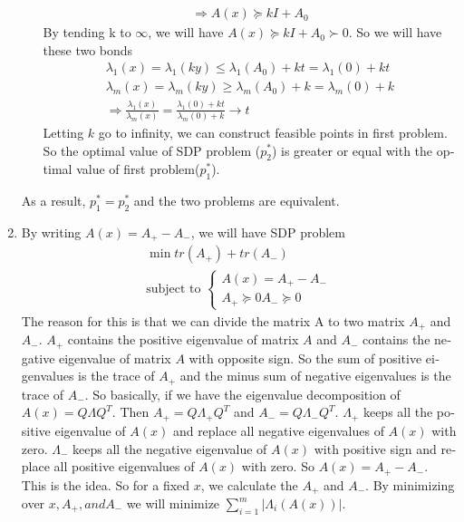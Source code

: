\begin{latin}
\begin{enumerate}
\begin{itemize}
\begin{gather*}
	 			\\
	 			\Rightarrow A(x) \succeq kI + A_{0}
	 		\end{gather*}
 			By tending k to $ \infty $, we will have $ A(x) \succeq kI + A_{0} \succ 0 $. So we will have these two bonds
 			\begin{gather*}
 				\lambda_1(x) = \lambda_1(ky) \leq \lambda_{1}(A_{0}) + kt = \lambda_1(0) + kt
 				\\
 				\lambda_m(x) = \lambda_m(ky) \geq \lambda_{m}(A_{0})  + k = \lambda_m(0) + k
 				\\
 				\Rightarrow \frac{\lambda_1(x)}{\lambda_m(x)} = \frac{\lambda_1(0) + kt}{\lambda_m(0) + k} \to t
 			\end{gather*}
 			Letting $ k $ go to infinity, we can construct feasible points in first problem. So the optimal value of SDP problem ($ p_{2}^{*} $) is greater or equal with the optimal value of first problem($ p_{1}^{*} $). 
	\end{itemize}
	As a result, $ p_{1}^{*} = p_{2}^{*} $ and the two problems are equivalent. 
	\item By writing $ A(x) = A_{+} - A_{-} $, we will have SDP problem
	\begin{gather*}
		\min tr(A_{+}) + tr(A_{-})
		\\
		\text{subject to } 
		\begin{cases}
			A(x) = A_{+} - A_{-}
			\\
			A_{+} \succeq 0 A_{−} \succeq 0
		\end{cases}
	\end{gather*}
	The reason for this is that we can divide the matrix A to two matrix  $ A_{+} $ and $ A_{-} $. $ A_{+} $ contains the positive eigenvalue of matrix $ A $ and $ A_{-} $ contains the negative eigenvalue of matrix $ A $ with opposite sign. So the sum of positive eigenvalues is the trace of $ A_{+} $ and the minus sum of negative eigenvalues is the trace of $ A_{-} $. So basically, if we have the eigenvalue decomposition of $ A(x) = Q \Lambda Q^{T} $. Then  $ A_{+} = Q \Lambda_{+} Q^{T} $ and $ A_{-} = Q \Lambda_{-} Q^{T} $. $ \Lambda_{+} $ keeps all the positive eigenvalue of $ A(x) $ and replace all negative eigenvalues of $ A(x) $ with zero. $ \Lambda_{-} $ keeps all the negative eigenvalue of $ A(x) $ with positive sign and replace all positive eigenvalues of $ A(x) $ with zero. So $ A(x) = A_{+} - A_{-} $. This is the idea. So for a fixed $ x $, we calculate the $ A_{+} $ and $ A_{-} $. By minimizing
	over $ x, A_{+}, and A_{−} $ we will minimize $ \sum_{i=1}^{m} |\Lambda_i(A(x))| $.
	\\
	
\end{enumerate}

\end{latin}